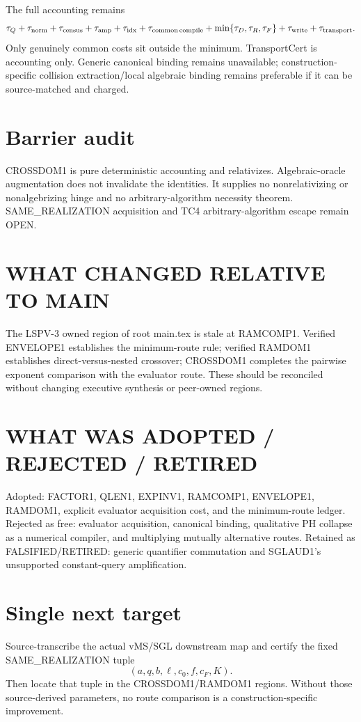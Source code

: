 \documentclass[11pt]{article}
\begin{document}
The full accounting remains
\[
\tau_Q+\tau_{\rm norm}+\tau_{\rm census}+\tau_{\rm amp}+\tau_{\rm idx}
+\tau_{\rm common\,compile}+\min\{\tau_D,\tau_R,\tau_F\}
+\tau_{\rm write}+\tau_{\rm transport}.
\]
Only genuinely common costs sit outside the minimum. TransportCert is accounting only. Generic canonical binding remains unavailable; construction-specific collision extraction/local algebraic binding remains preferable if it can be source-matched and charged.

\section*{Barrier audit}
CROSSDOM1 is pure deterministic accounting and relativizes. Algebraic-oracle augmentation does not invalidate the identities. It supplies no nonrelativizing or nonalgebrizing hinge and no arbitrary-algorithm necessity theorem. SAME\_REALIZATION acquisition and TC4 arbitrary-algorithm escape remain OPEN.

\section*{WHAT CHANGED RELATIVE TO MAIN}
The LSPV-3 owned region of root main.tex is stale at RAMCOMP1. Verified ENVELOPE1 establishes the minimum-route rule; verified RAMDOM1 establishes direct-versus-nested crossover; CROSSDOM1 completes the pairwise exponent comparison with the evaluator route. These should be reconciled without changing executive synthesis or peer-owned regions.

\section*{WHAT WAS ADOPTED / REJECTED / RETIRED}
Adopted: FACTOR1, QLEN1, EXPINV1, RAMCOMP1, ENVELOPE1, RAMDOM1, explicit evaluator acquisition cost, and the minimum-route ledger. Rejected as free: evaluator acquisition, canonical binding, qualitative PH collapse as a numerical compiler, and multiplying mutually alternative routes. Retained as FALSIFIED/RETIRED: generic quantifier commutation and SGLAUD1's unsupported constant-query amplification.

\section*{Single next target}
Source-transcribe the actual vMS/SGL downstream map and certify the fixed SAME\_REALIZATION tuple
\[
(a,q,b,\ell,c_0,f,c_F,K).
\]
Then locate that tuple in the CROSSDOM1/RAMDOM1 regions. Without those source-derived parameters, no route comparison is a construction-specific improvement.
\end{document}
